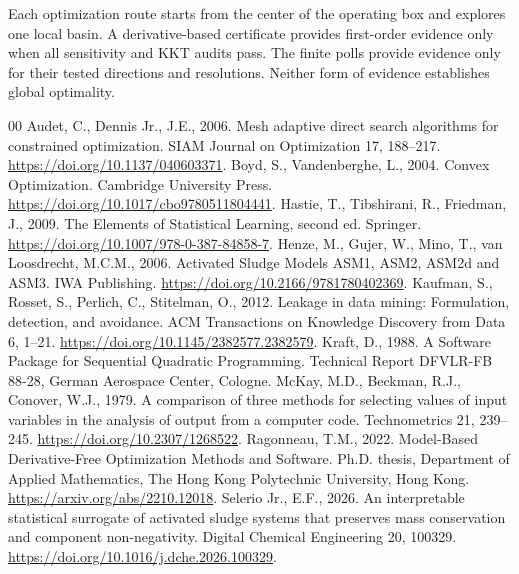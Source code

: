 \documentclass[a4paper,fleqn]{cas-sc}
\begin{document}
Each optimization route starts from the center of the operating box and explores one local basin. A derivative-based certificate provides first-order evidence only when all sensitivity and KKT audits pass. The finite polls provide evidence only for their tested directions and resolutions. Neither form of evidence establishes global optimality.


\begin{thebibliography}{00}
Audet, C., Dennis Jr., J.E., 2006. Mesh adaptive direct search algorithms for constrained optimization. SIAM Journal on Optimization 17, 188--217. \url{https://doi.org/10.1137/040603371}.
Boyd, S., Vandenberghe, L., 2004. Convex Optimization. Cambridge University Press. \url{https://doi.org/10.1017/cbo9780511804441}.
Hastie, T., Tibshirani, R., Friedman, J., 2009. The Elements of Statistical Learning, second ed. Springer. \url{https://doi.org/10.1007/978-0-387-84858-7}.
Henze, M., Gujer, W., Mino, T., van Loosdrecht, M.C.M., 2006. Activated Sludge Models ASM1, ASM2, ASM2d and ASM3. IWA Publishing. \url{https://doi.org/10.2166/9781780402369}.
Kaufman, S., Rosset, S., Perlich, C., Stitelman, O., 2012. Leakage in data mining: Formulation, detection, and avoidance. ACM Transactions on Knowledge Discovery from Data 6, 1--21. \url{https://doi.org/10.1145/2382577.2382579}.
Kraft, D., 1988. A Software Package for Sequential Quadratic Programming. Technical Report DFVLR-FB 88-28, German Aerospace Center, Cologne.
McKay, M.D., Beckman, R.J., Conover, W.J., 1979. A comparison of three methods for selecting values of input variables in the analysis of output from a computer code. Technometrics 21, 239--245. \url{https://doi.org/10.2307/1268522}.
Ragonneau, T.M., 2022. Model-Based Derivative-Free Optimization Methods and Software. Ph.D. thesis, Department of Applied Mathematics, The Hong Kong Polytechnic University, Hong Kong. \url{https://arxiv.org/abs/2210.12018}.
Selerio Jr., E.F., 2026. An interpretable statistical surrogate of activated sludge systems that preserves mass conservation and component non-negativity. Digital Chemical Engineering 20, 100329. \url{https://doi.org/10.1016/j.dche.2026.100329}.

\end{thebibliography}
\end{document}

